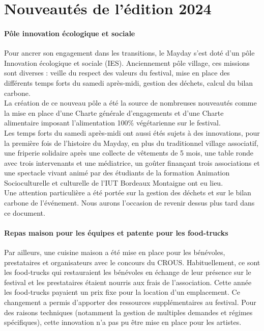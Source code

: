 \documentclass[12pt,a4paper]{report}
\begin{document}
\section{Nouveautés de l'édition 2024}

\paragraph{Pôle innovation écologique et sociale}
Pour ancrer son engagement dans les transitions, le Mayday s’est doté d’un pôle Innovation écologique et sociale (IES). Anciennement pôle village, ces missions sont diverses : veille du respect des valeurs du festival, mise en place des différents temps forts du samedi après-midi, gestion des déchets, calcul du bilan carbone.\\

La création de ce nouveau pôle a été la source de nombreuses nouveautés comme la mise en place d’une Charte générale d’engagements et d’une Charte alimentaire imposant l'alimentation 100\% végétarienne sur le festival.\\

Les temps forts du samedi après-midi ont aussi étés sujets à des innovations, pour la première fois de l’histoire du Mayday, en plus du traditionnel village associatif, une friperie solidaire après une collecte de vêtements de 5 mois, une table ronde avec trois intervenants et une médiatrice, un goûter finançant trois associations et une spectacle vivant animé par des étudiants de la formation Animation Socioculturelle et culturelle de l’IUT Bordeaux Montaigne ont eu lieu.\\

Une attention particulière a été portée sur la gestion des déchets et sur le bilan carbone de l’événement. Nous aurons l’occasion de revenir dessus plus tard dans ce document.

\paragraph{Repas maison pour les équipes et patente pour les food-trucks}
Par ailleurs, une cuisine maison a été mise en place pour les bénévoles, prestataires et organisateurs avec le concours du CROUS. Habituellement, ce sont les food-trucks qui restauraient les bénévoles en échange de leur présence sur le festival et les prestataires étaient nourris aux frais de l’association. Cette année les food-trucks payaient un prix fixe pour la location d'un emplacement. Ce changement a permis d’apporter des ressources supplémentaires au festival. Pour des raisons techniques (notamment la gestion de multiples demandes et régimes spécifiques), cette innovation n'a pas pu être mise en place pour les artistes.
\end{document}
